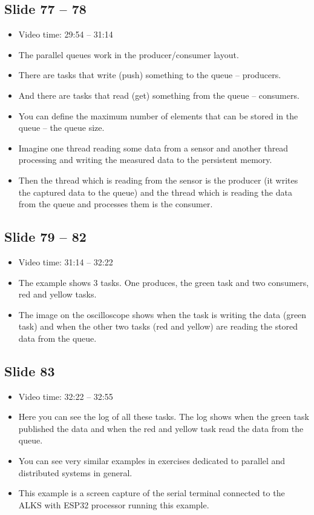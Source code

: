 \documentclass[12pt, a4paper]{article}
\begin{document}
	\subsection{Slide 77 -- 78}
	\begin{itemize}
		\item Video time: 29:54 -- 31:14
		\item The parallel queues work in the producer/consumer layout.
		\item There are tasks that write (push) something to the queue -- producers.
		\item And there are tasks that read (get) something from the queue -- consumers.
		\item You can define the maximum number of elements that can be stored in the queue -- the queue size.
		\item Imagine one thread reading some data from a sensor and another thread processing and writing the measured data to the persistent memory.
		\item Then the thread which is reading from the sensor is the producer (it writes the captured data to the queue) and the thread which is reading the data from the queue and processes them is the consumer.
	\end{itemize}

	\subsection{Slide 79 -- 82}
	\begin{itemize}
		\item Video time: 31:14 -- 32:22
		\item The example shows 3 tasks. One produces, the green task and two consumers, red and yellow tasks.
		\item The image on the oscilloscope shows when the task is writing the data (green task) and when the other two tasks (red and yellow) are reading the stored data from the queue.
	\end{itemize}

	\subsection{Slide 83}
	\begin{itemize}
		\item Video time: 32:22 -- 32:55
		\item Here you can see the log of all these tasks. The log shows when the green task published the data and when the red and yellow task read the data from the queue.
		\item You can see very similar examples in exercises dedicated to parallel and distributed systems in general.
		\item This example is a screen capture of the serial terminal connected to the ALKS with ESP32 processor running this example.
	\end{itemize}
\end{document}
